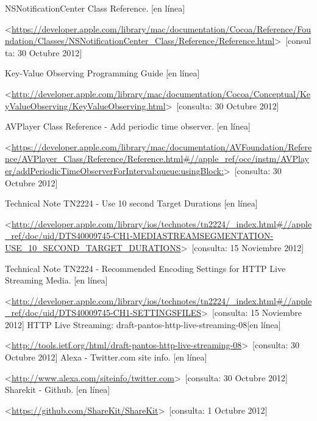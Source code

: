 \begin{thebibliography}{99}
\begin{sloppypar}
%
NSNotificationCenter Class Reference. [en línea]\

\textless \url{https://developer.apple.com/library/mac/documentation/Cocoa/Reference/Foundation/Classes/NSNotificationCenter_Class/Reference/Reference.html}\textgreater \ [consulta: 30 Octubre 2012]

Key-Value Observing Programming Guide [en línea]\

\textless \url{http://developer.apple.com/library/mac/documentation/Cocoa/Conceptual/KeyValueObserving/KeyValueObserving.html}\textgreater \ [consulta: 30 Octubre 2012]

%
AVPlayer Class Reference - Add periodic time observer. [en línea]\

\textless \url{https://developer.apple.com/library/mac/documentation/AVFoundation/Reference/AVPlayer_Class/Reference/Reference.html\#//apple_ref/occ/instm/AVPlayer/addPeriodicTimeObserverForInterval:queue:usingBlock:}\textgreater \ [consulta: 30 Octubre 2012]


Technical Note TN2224 - Use 10 second Target Durations [en línea]\

\textless \url{http://developer.apple.com/library/ios/technotes/tn2224/_index.html\#//apple_ref/doc/uid/DTS40009745-CH1-MEDIASTREAMSEGMENTATION-USE_10_SECOND_TARGET_DURATIONS}\textgreater \ [consulta: 15 Noviembre 2012]

Technical Note TN2224 - Recommended Encoding Settings for HTTP Live Streaming Media. [en línea]\

\textless \url{http://developer.apple.com/library/ios/technotes/tn2224/_index.html\#//apple_ref/doc/uid/DTS40009745-CH1-SETTINGSFILES}\textgreater \ [consulta: 15 Noviembre 2012]
HTTP Live Streaming: draft-pantos-http-live-streaming-08[en línea]\

\textless \url{http://tools.ietf.org/html/draft-pantos-http-live-streaming-08}\textgreater \ [consulta: 30 Octubre 2012]
%
Alexa - Twitter.com site info. [en línea]\

\textless \url{http://www.alexa.com/siteinfo/twitter.com}\textgreater \ [consulta: 30 Octubre 2012] 
%
Sharekit - Github. [en línea]\

\textless \url{https://github.com/ShareKit/ShareKit}\textgreater \ [consulta: 1 Octubre 2012] 


\end{sloppypar}
\end{thebibliography}
